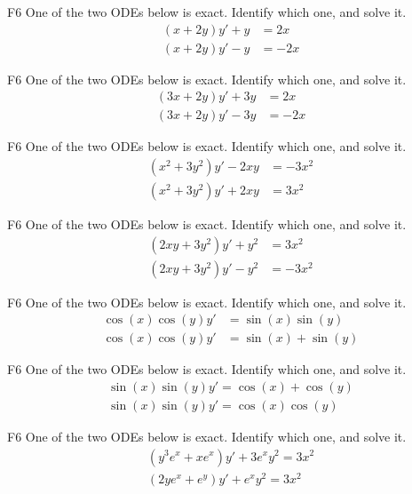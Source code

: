 

\begin{problem}{F6}
One of the two ODEs below is exact.  Identify which one, and solve it.
\begin{align*}
 (x + 2y)y'+y &=2x \\ %
 (x + 2y)y'-y &=-2x  
\end{align*}
\end{problem}

\begin{problem}{F6}
One of the two ODEs below is exact.  Identify which one, and solve it.
\begin{align*}
(3x + 2y)y'+3y &= 2x \\ %
(3x + 2y)y'-3y &= -2x  
\end{align*}
\end{problem}

\begin{problem}{F6}
One of the two ODEs below is exact.  Identify which one, and solve it.
\begin{align*}
(x^2 + 3y^2)y' -2xy &= -3x^2 \\
(x^2 + 3y^2)y' +2xy &= 3x^2  %
\end{align*}
\end{problem}

\begin{problem}{F6}
One of the two ODEs below is exact.  Identify which one, and solve it.
\begin{align*}
(2xy + 3y^2)y' +y^2 &= 3x^2\\ %
(2xy + 3y^2)y' -y^2 &= -3x^2
\end{align*}
\end{problem}

\begin{problem}{F6}
One of the two ODEs below is exact.  Identify which one, and solve it.
\begin{align*}
\cos(x)\cos(y)y' &= \sin(x)\sin(y) \\ %
\cos(x)\cos(y)y' &= \sin(x)+\sin(y)
\end{align*}
\end{problem}

\begin{problem}{F6}
One of the two ODEs below is exact.  Identify which one, and solve it.
\begin{align*}
\sin(x)\sin(y)y' = \cos(x)+\cos(y) \\
\sin(x)\sin(y)y' = \cos(x)\cos(y)  %
\end{align*}
\end{problem}

\begin{problem}{F6}
One of the two ODEs below is exact.  Identify which one, and solve it.
\begin{align*}
(y^3e^x+xe^x)y' +3e^xy^2 = 3x^2\\
(2ye^x+e^y)y' +e^xy^2 = 3x^2 %
\end{align*}
\end{problem}


